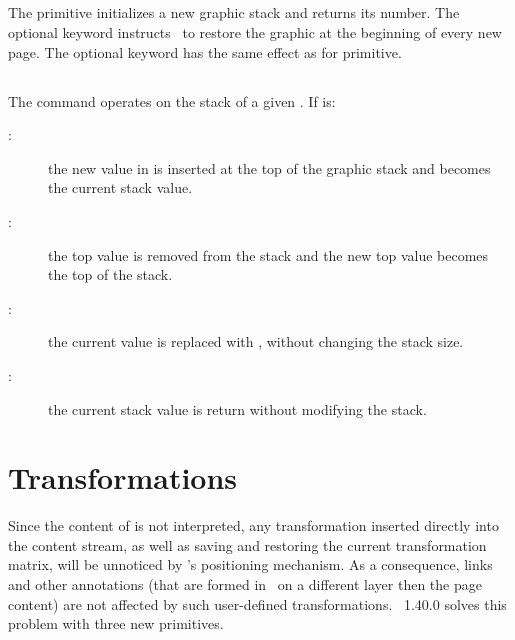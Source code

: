 \documentclass{pdftexmanual}
\begin{document}
\subsection{}

The primitive initializes a new graphic stack and returns its number.
The optional  keyword instructs \PDFTEX\ to restore the
graphic at the beginning of every new page. The optional
 keyword has the same effect as for 
primitive. 

\subsection{}
\noindent {} \Means
   \Or {} \Or {} \Or {}

The command operates on the stack of a given .
If  is:

\begin{description}
\item[:] the new value in  is inserted at
the top of the graphic stack and becomes the current stack value.

\item[:] the top value is removed from the stack and the new
top value becomes the top of the stack.

\item[:] the current value is replaced with
, without changing the stack size.

\item[:] the current stack value is return without
modifying the stack.
\end{description}


\section{Transformations}

Since the content of  is not interpreted, any
transformation inserted directly into the content stream, as well as
saving and restoring the current transformation matrix, will be
unnoticed by \PDFTEX's positioning mechanism. As a consequence, links
and other annotations (that are formed in \PDF\ on a different layer
then the page content) are not affected by such user-defined
transformations. \PDFTEX\ 1.40.0 solves this problem with three new
primitives.
\end{document}
